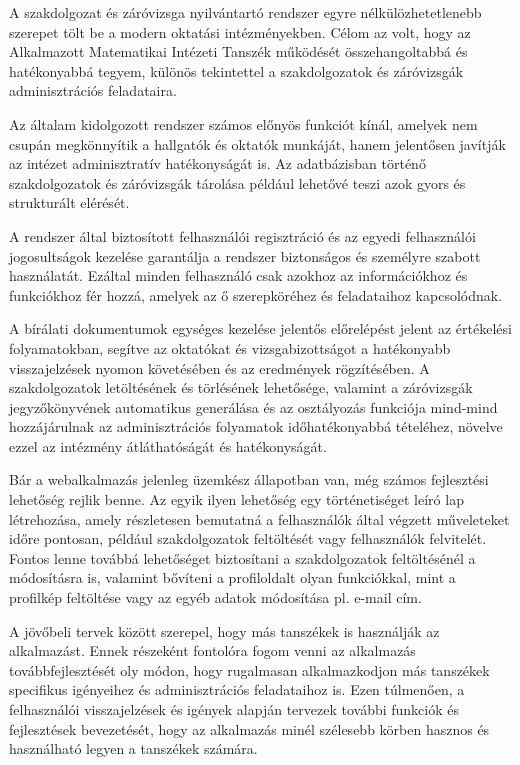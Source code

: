 

A szakdolgozat és záróvizsga nyilvántartó rendszer egyre nélkülözhetetlenebb szerepet tölt be a modern oktatási intézményekben. Célom az volt, hogy az Alkalmazott Matematikai Intézeti Tanszék működését összehangoltabbá és hatékonyabbá tegyem, különös tekintettel a szakdolgozatok és záróvizsgák adminisztrációs feladataira.

Az általam kidolgozott rendszer számos előnyös funkciót kínál, amelyek nem csupán megkönnyítik a hallgatók és oktatók munkáját, hanem jelentősen javítják az intézet adminisztratív hatékonyságát is. Az adatbázisban történő szakdolgozatok és záróvizsgák tárolása például lehetővé teszi azok gyors és strukturált elérését.

A rendszer által biztosított felhasználói regisztráció és az egyedi felhasználói jogosultságok kezelése garantálja a rendszer biztonságos és személyre szabott használatát. Ezáltal minden felhasználó csak azokhoz az információkhoz és funkciókhoz fér hozzá, amelyek az ő szerepköréhez és feladataihoz kapcsolódnak.

A bírálati dokumentumok egységes kezelése jelentős előrelépést jelent az értékelési folyamatokban, segítve az oktatókat és vizsgabizottságot a hatékonyabb visszajelzések nyomon követésében és az eredmények rögzítésében. A szakdolgozatok letöltésének és törlésének lehetősége, valamint a záróvizsgák jegyzőkönyvének automatikus generálása és az osztályozás funkciója mind-mind hozzájárulnak az adminisztrációs folyamatok időhatékonyabbá tételéhez, növelve ezzel az intézmény átláthatóságát és hatékonyságát.

Bár a webalkalmazás jelenleg üzemkész állapotban van, még számos fejlesztési lehetőség rejlik benne. Az egyik ilyen lehetőség egy történetiséget leíró lap létrehozása, amely részletesen bemutatná a felhasználók által végzett műveleteket időre pontosan, például szakdolgozatok feltöltését vagy felhasználók felvitelét. Fontos lenne továbbá lehetőséget biztosítani a szakdolgozatok feltöltésénél a módosításra is, valamint bővíteni a profiloldalt olyan funkciókkal, mint a profilkép feltöltése vagy az egyéb adatok módosítása pl. e-mail cím.

A jövőbeli tervek között szerepel, hogy más tanszékek is használják az alkalmazást. Ennek részeként fontolóra fogom venni az alkalmazás továbbfejlesztését oly módon, hogy rugalmasan alkalmazkodjon más tanszékek specifikus igényeihez és adminisztrációs feladataihoz is. Ezen túlmenően, a felhasználói visszajelzések és igények alapján tervezek további funkciók és fejlesztések bevezetését, hogy az alkalmazás minél szélesebb körben hasznos és használható legyen a tanszékek számára. 

